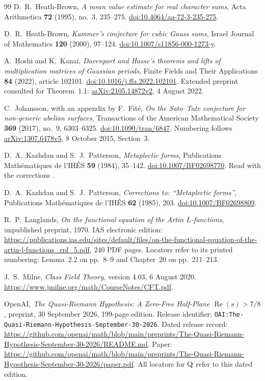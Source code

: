 \documentclass[11pt,a4paper]{article}
\numberwithin{equation}{section}
\theoremstyle{definition}
\theoremstyle{remark}
\newcommand{\Qsrc}{\textup{Q}}
\begin{document}
\begin{thebibliography}{99}
D.~R.~Heath-Brown,
\emph{A mean value estimate for real character sums},
Acta Arithmetica \textbf{72} (1995), no.~3, 235--275.
\href{https://doi.org/10.4064/aa-72-3-235-275}{doi:10.4064/aa-72-3-235-275}.

D.~R.~Heath-Brown,
\emph{Kummer's conjecture for cubic Gauss sums},
Israel Journal of Mathematics \textbf{120} (2000), 97--124.
\href{https://doi.org/10.1007/s11856-000-1273-y}{doi:10.1007/s11856-000-1273-y}.

A.~Hoshi and K.~Kanai,
\emph{Davenport and Hasse's theorems and lifts of multiplication
matrices of Gaussian periods},
Finite Fields and Their Applications \textbf{84} (2022), article 102101.
\href{https://doi.org/10.1016/j.ffa.2022.102101}{doi:10.1016/j.ffa.2022.102101}.
Extended preprint consulted for Theorem~1.1:
\href{https://arxiv.org/abs/2105.14872v2}{arXiv:2105.14872v2}, 4 August 2022.

C.~Johansson, with an appendix by F.~Fit\'e,
\emph{On the Sato--Tate conjecture for non-generic abelian surfaces},
Transactions of the American Mathematical Society
\textbf{369} (2017), no.~9, 6303--6325.
\href{https://doi.org/10.1090/tran/6847}{doi:10.1090/tran/6847}.
Numbering follows \href{https://arxiv.org/abs/1307.6478v5}{arXiv:1307.6478v5},
8 October 2015, Section~3.

D.~A.~Kazhdan and S.~J.~Patterson,
\emph{Metaplectic forms},
Publications Math\'ematiques de l'IH\'ES \textbf{59} (1984), 35--142.
\href{https://doi.org/10.1007/BF02698770}{doi:10.1007/BF02698770}.
Read with the corrections \cite{KPcorr}.

D.~A.~Kazhdan and S.~J.~Patterson,
\emph{Corrections to: ``Metaplectic forms''},
Publications Math\'ematiques de l'IH\'ES \textbf{62} (1985), 203.
\href{https://doi.org/10.1007/BF02698809}{doi:10.1007/BF02698809}.

R.~P.~Langlands,
\emph{On the functional equation of the Artin $L$-functions},
unpublished preprint, 1970.
IAS electronic edition:
\url{https://publications.ias.edu/sites/default/files/on-the-functional-equation-of-the-artin-l-functions_rpl_5.pdf},
240 PDF pages.  Locators refer to its printed numbering:
Lemma~2.2 on pp.~8--9 and Chapter~20 on pp.~211--213.

J.~S.~Milne,
\emph{Class Field Theory}, version 4.03, 6 August 2020.
\url{https://www.jmilne.org/math/CourseNotes/CFT.pdf}.

OpenAI,
\emph{The Quasi-Riemann Hypothesis: A Zero-Free Half-Plane
$\operatorname{Re}(s)>7/8$},
preprint, 30 September 2026, 199-page edition.
Release identifier:
\nolinkurl{OAI:The-Quasi-Riemann-Hypothesis-September-30-2026}.
Dated release record:
\url{https://github.com/openai/math/blob/main/preprints/The-Quasi-Riemann-Hypothesis-September-30-2026/README.md}.
Paper:
\url{https://github.com/openai/math/blob/main/preprints/The-Quasi-Riemann-Hypothesis-September-30-2026/paper.pdf}.
All locators for $\Qsrc$ refer to this dated edition.


\end{thebibliography}
\end{document}
